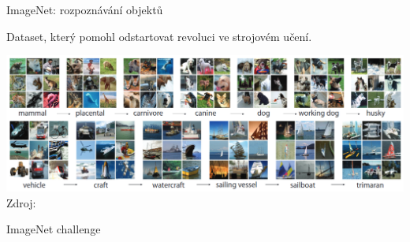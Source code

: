 \documentclass[aspectratio=169,dvipsnames]{beamer}
\begin{document}

\begin{frame}{ImageNet: rozpoznávání objektů}

    \begin{center}
        Dataset, který pomohl odstartovat revoluci ve strojovém učení.
    \end{center}

    \centering

    \includegraphics[scale=.34]{./img/imagenet.png} \\
    {\tiny Zdroj: \citet[obr.\ 1]{deng2009imagenet}}


\end{frame}


\begin{frame}{ImageNet challenge}

    \centering
    

\end{frame}

\end{document}
